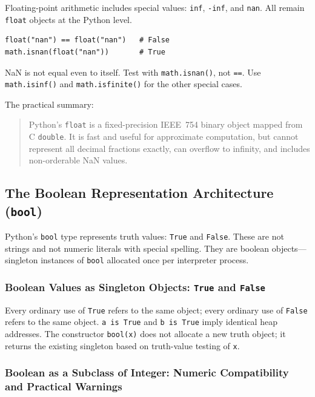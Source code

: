 \documentclass[a4paper,twoside]{report}
\begin{document}
Floating-point arithmetic includes special values: \texttt{inf}, \texttt{-inf}, and \texttt{nan}. All remain \texttt{float} objects at the Python level.

\begin{verbatim}
float("nan") == float("nan")   # False
math.isnan(float("nan"))       # True
\end{verbatim}

NaN is not equal even to itself. Test with \texttt{math.isnan()}, not \texttt{==}. Use \texttt{math.isinf()} and \texttt{math.isfinite()} for the other special cases.

The practical summary:

\begin{quote}
Python's \texttt{float} is a fixed-precision IEEE~754 binary object mapped from C \texttt{double}. It is fast and useful for approximate computation, but cannot represent all decimal fractions exactly, can overflow to infinity, and includes non-orderable NaN values.
\end{quote}


\subsection{The Boolean Representation Architecture (\texttt{bool})}

Python's \texttt{bool} type represents truth values: \texttt{True} and \texttt{False}. These are not strings and not numeric literals with special spelling. They are boolean objects---singleton instances of \texttt{bool} allocated once per interpreter process.

\subsubsection{Boolean Values as Singleton Objects: \texttt{True} and \texttt{False}}

Every ordinary use of \texttt{True} refers to the same object; every ordinary use of \texttt{False} refers to the same object. \texttt{a is True} and \texttt{b is True} imply identical heap addresses. The constructor \texttt{bool(x)} does not allocate a new truth object; it returns the existing singleton based on truth-value testing of \texttt{x}.

\subsubsection{Boolean as a Subclass of Integer: Numeric Compatibility and Practical Warnings}
\end{document}

